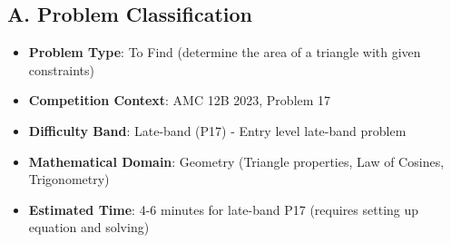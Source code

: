 \documentclass[12pt]{article}
\begin{document}
\begin{problemconfigbox}
\subsection*{A. Problem Classification}
\begin{itemize}[leftmargin=*]
    \item \textbf{Problem Type}: To Find (determine the area of a triangle with given constraints)
    \item \textbf{Competition Context}: AMC 12B 2023, Problem 17
    \item \textbf{Difficulty Band}: Late-band (P17) - Entry level late-band problem
    \item \textbf{Mathematical Domain}: Geometry (Triangle properties, Law of Cosines, Trigonometry)
    \item \textbf{Estimated Time}: 4-6 minutes for late-band P17 (requires setting up equation and solving)
\end{itemize}


\end{problemconfigbox}
\end{document}
